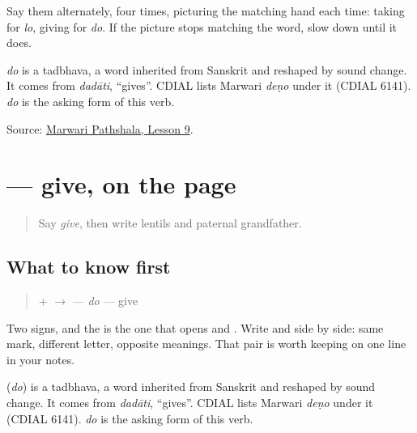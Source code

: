 Say them alternately, four times, picturing the matching hand each time: taking for \emph{lo}, giving for \emph{do}. If the picture stops matching the word, slow down until it does.

\begin{cousinweb}
\emph{do} is a tadbhava, a word inherited from Sanskrit and reshaped by sound change. It comes from \emph{dadāti}, \textquotedblleft{}gives\textquotedblright{}. CDIAL lists Marwari \emph{deṇo} under it (CDIAL 6141). \emph{do} is the asking form of this verb.
\end{cousinweb}

\begin{tcolorbox}[breakable,colback=teal!4,colframe=teal!35!black,title={Before you move on}]
Source: \href{https://www.marwaripathshala.com/marwari-lesson-9-english}{Marwari Pathshala, Lesson 9}.
\end{tcolorbox}
\section[\texorpdfstring{\mw{दो} (do)}{दो (do)}]{ — give, on the page}

\label{lesson:MW-C24-do}



\begin{quote}
Say \emph{give}, then write lentils and paternal grandfather.
\end{quote}

\subsection*{What to know first}
\begin{quote}
\textbf{} + \textbf{} $\to$ \textbf{} — \emph{do} — give
\end{quote}

Two signs, and the \textbf{} is the one that opens \textbf{} and \textbf{}. Write \textbf{} and \textbf{} side by side: same mark, different letter, opposite meanings. That pair is worth keeping on one line in your notes.

\begin{cousinweb}
\textbf{} (\emph{do}) is a tadbhava, a word inherited from Sanskrit and reshaped by sound change. It comes from \emph{dadāti}, \textquotedblleft{}gives\textquotedblright{}. CDIAL lists Marwari \emph{deṇo} under it (CDIAL 6141). \emph{do} is the asking form of this verb.
\end{cousinweb}

